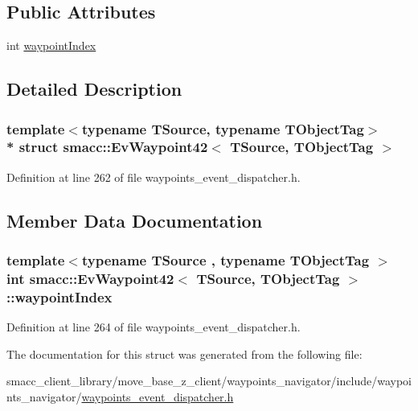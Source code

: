 \subsection*{Public Attributes}
\begin{DoxyCompactItemize}
\item 
int \hyperlink{structsmacc_1_1EvWaypoint42_a8cd74cd8d8a834a5be3224fb5d3c91b1}{waypoint\+Index}
\end{DoxyCompactItemize}


\subsection{Detailed Description}
\subsubsection*{template$<$typename T\+Source, typename T\+Object\+Tag$>$\\*
struct smacc\+::\+Ev\+Waypoint42$<$ T\+Source, T\+Object\+Tag $>$}



Definition at line 262 of file waypoints\+\_\+event\+\_\+dispatcher.\+h.



\subsection{Member Data Documentation}
\subsubsection[{\texorpdfstring{waypoint\+Index}{waypointIndex}}]{\setlength{\rightskip}{0pt plus 5cm}template$<$typename T\+Source , typename T\+Object\+Tag $>$ int {\bf smacc\+::\+Ev\+Waypoint42}$<$ T\+Source, T\+Object\+Tag $>$\+::waypoint\+Index}\hypertarget{structsmacc_1_1EvWaypoint42_a8cd74cd8d8a834a5be3224fb5d3c91b1}{}\label{structsmacc_1_1EvWaypoint42_a8cd74cd8d8a834a5be3224fb5d3c91b1}


Definition at line 264 of file waypoints\+\_\+event\+\_\+dispatcher.\+h.



The documentation for this struct was generated from the following file\+:\begin{DoxyCompactItemize}
\item 
smacc\+\_\+client\+\_\+library/move\+\_\+base\+\_\+z\+\_\+client/waypoints\+\_\+navigator/include/waypoints\+\_\+navigator/\hyperlink{waypoints__event__dispatcher_8h}{waypoints\+\_\+event\+\_\+dispatcher.\+h}\end{DoxyCompactItemize}

